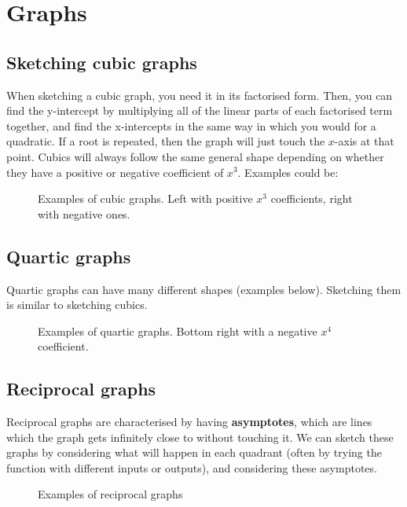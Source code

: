 \section{Graphs}
\subsection{Sketching cubic graphs}
When sketching a cubic graph, you need it in its factorised form. Then, you can find the y-intercept by multiplying all of the linear parts of each factorised term together, and find the x-intercepts in the same way in which you would for a quadratic. If a root is repeated, then the graph will just touch the $x$-axis at that point. Cubics will always follow the same general shape depending on whether they have a positive or negative coefficient of $x^3$. Examples could be:

\begin{figure}[ht]
    \centering
    \caption{Examples of cubic graphs. Left with positive $x^3$ coefficients, right with negative ones.}
    \label{fig:examples-of-cubic-graphs}
\end{figure}

\subsection{Quartic graphs}
Quartic graphs can have many different shapes (examples below). Sketching them is similar to sketching cubics.

\begin{figure}[ht]
    \centering
    \caption{Examples of quartic graphs. Bottom right with a negative $x^4$ coefficient.}
    \label{fig:examples-of-quartic-graphs}
\end{figure}

\subsection{Reciprocal graphs}
Reciprocal graphs are characterised by having \textbf{asymptotes}, which are lines which the graph gets infinitely close to without touching it. We can sketch these graphs by considering what will happen in each quadrant (often by trying the function with different inputs or outputs), and considering these asymptotes.

\begin{figure}[ht]
    \centering
    \caption{Examples of reciprocal graphs}
    \label{fig:examples-of-reciprocal-graphs}
\end{figure}

